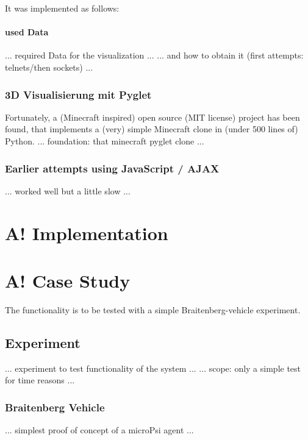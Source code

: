 It was implemented as follows:

\paragraph{used Data}
... required Data for the visualization ...
... and how to obtain it (first attempts: telnets/then sockets) ...

\subsubsection{3D Visualisierung mit Pyglet}
Fortunately, a (Minecraft inspired) open source (MIT license) project has been found, that implements a (very) simple Minecraft clone in (under 500 lines of) Python.\cite{github_minecraftpython}
... foundation: that minecraft pyglet clone ...

\subsubsection{Earlier attempts using JavaScript / AJAX}
... worked well but a little slow ...

\section{A! Implementation}

\section{A! Case Study}

The functionality is to be tested with a simple Braitenberg-vehicle experiment.

\subsection{Experiment}
... experiment to test functionality of the system ...
... scope: only a simple test for time reasons ...

\subsubsection{Braitenberg Vehicle}
... simplest proof of concept of a microPsi agent ...